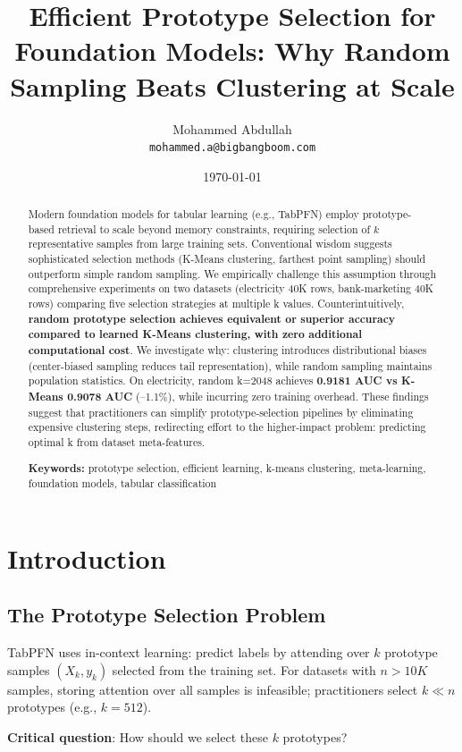\documentclass[11pt,a4paper]{article}
\title{Efficient Prototype Selection for Foundation Models: Why Random Sampling Beats Clustering at Scale}
\author{
  Mohammed Abdullah\\
  \texttt{mohammed.a@bigbangboom.com}
}
\date{\today}
\begin{document}
\maketitle

\begin{abstract}
Modern foundation models for tabular learning (e.g., TabPFN) employ prototype-based retrieval to scale beyond memory constraints, requiring selection of $k$ representative samples from large training sets. Conventional wisdom suggests sophisticated selection methods (K-Means clustering, farthest point sampling) should outperform simple random sampling. We empirically challenge this assumption through comprehensive experiments on two datasets (electricity 40K rows, bank-marketing 40K rows) comparing five selection strategies at multiple k values. Counterintuitively, \textbf{random prototype selection achieves equivalent or superior accuracy compared to learned K-Means clustering, with zero additional computational cost}. We investigate why: clustering introduces distributional biases (center-biased sampling reduces tail representation), while random sampling maintains population statistics. On electricity, random k=2048 achieves \textbf{0.9181 AUC vs K-Means 0.9078 AUC} (--1.1\%), while incurring zero training overhead. These findings suggest that practitioners can simplify prototype-selection pipelines by eliminating expensive clustering steps, redirecting effort to the higher-impact problem: predicting optimal k from dataset meta-features.

\textbf{Keywords:} prototype selection, efficient learning, k-means clustering, meta-learning, foundation models, tabular classification
\end{abstract}

\section{Introduction}

\subsection{The Prototype Selection Problem}

TabPFN uses in-context learning: predict labels by attending over $k$ prototype samples $(X_k, y_k)$ selected from the training set. For datasets with $n > 10K$ samples, storing attention over all samples is infeasible; practitioners select $k \ll n$ prototypes (e.g., $k=512$).

\textbf{Critical question}: How should we select these $k$ prototypes?
\end{document}
